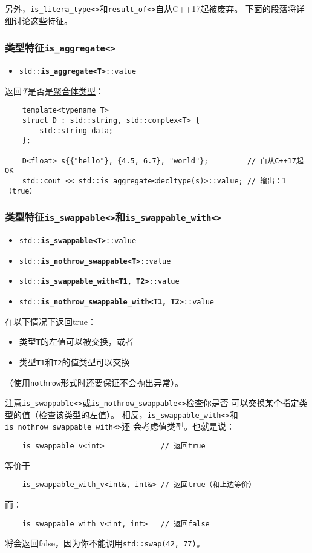 另外，\texttt{is\_litera\_type<>}和\texttt{result\_of<>}自从C++17起被废弃。
下面的段落将详细讨论这些特征。

\subsubsection{类型特征\texttt{is\_aggregate<>}}\label{ch21.2.1}
\begin{itemize}
    \item[] \texttt{std::\textbf{is\_aggregate<T>}::value}
\end{itemize}
返回\emph{T}是否是\hyperref[ch4.3]{聚合体类型}：
\begin{lstlisting}
    template<typename T>
    struct D : std::string, std::complex<T> {
        std::string data;
    };

    D<float> s{{"hello"}, {4.5, 6.7}, "world"};         // 自从C++17起OK
    std::cout << std::is_aggregate<decltype(s)>::value; // 输出：1（true）
\end{lstlisting}

\subsubsection{类型特征\texttt{is\_swappable<>}和\texttt{is\_swappable\_with<>}}
\begin{itemize}
    \item[] \texttt{std::\textbf{is\_swappable<T>}::value}
    \item[] \texttt{std::\textbf{is\_nothrow\_swappable<T>}::value}
    \item[] \texttt{std::\textbf{is\_swappable\_with<T1, T2>}::value}
    \item[] \texttt{std::\textbf{is\_nothrow\_swappable\_with<T1, T2>}::value}
\end{itemize}
在以下情况下返回true：
\begin{itemize}
    \item 类型\texttt{T}的左值可以被交换，或者
    \item 类型\texttt{T1}和\texttt{T2}的值类型可以交换
\end{itemize}
（使用\texttt{nothrow}形式时还要保证不会抛出异常）。

注意\texttt{is\_swappable<>}或\texttt{is\_nothrow\_swappable<>}检查你是否
可以交换某个指定类型的值（检查该类型的左值）。
相反，\texttt{is\_swappable\_with<>}和\texttt{is\_nothrow\_swappable\_with<>}还
会考虑值类型。也就是说：
\begin{lstlisting}
    is_swappable_v<int>             // 返回true
\end{lstlisting}
等价于
\begin{lstlisting}
    is_swappable_with_v<int&, int&> // 返回true（和上边等价）
\end{lstlisting}
而：
\begin{lstlisting}
    is_swappable_with_v<int, int>   // 返回false
\end{lstlisting}
将会返回false，因为你不能调用\texttt{std::swap(42, 77)}。

